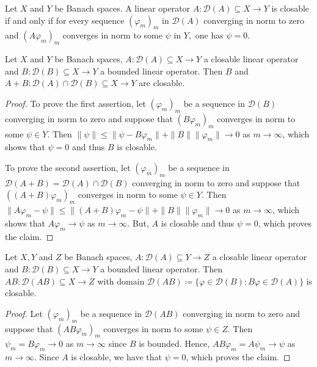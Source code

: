\documentclass[english]{myarticle}
\begin{document}
\begin{sloppypar}
\begin{lemma} \label{lemma:closabledef}
Let $X$ and $Y$ be Banach spaces. A linear operator $A : \mathcal{D}(A) \subseteq X \to Y$ is closable if and only if for every sequence $(\varphi_m)_m$ in $\mathcal{D}(A)$ converging in norm to zero and $(A \varphi_m)_m$ converges in norm to some $\psi$ in $Y,$ one has $\psi = 0$.
\end{lemma}

\begin{lemma} \label{lemma:closablesum}
   Let $X$ and $Y$ be Banach spaces, $A : \mathcal{D}(A) \subseteq X \to Y$ a closable linear operator and $B : \mathcal{D}(B) \subseteq X \to Y$ a bounded linear operator. Then $B$ and $A + B : \mathcal{D}(A) \cap \mathcal{D}(B) \subseteq X \to Y$ are closable.
\end{lemma}
\begin{proof}
To prove the first assertion, let $(\varphi_m)_m$ be a sequence in $\mathcal{D}(B)$ converging in norm to zero and suppose that $(B\varphi_m)_m$ converges in norm to some $\psi \in Y$. Then $\|\psi\| \leq \| \psi - B \varphi_m \| + \|B\| \|\varphi_m\| \to 0$ as $m \to \infty$, which shows that $\psi = 0$ and thus $B$ is closable.

To prove the second assertion, let $(\varphi_m)_m$ be a sequence in $\mathcal{D}(A + B) = \mathcal{D}(A) \cap \mathcal{D}(B)$ converging in norm to zero and suppose that $((A+B)\varphi_m)_m$ converges in norm to some $\psi \in Y$. Then $\|A \varphi_m - \psi \| \leq \|(A+B)\varphi_m - \psi \| + \|B \| \|\varphi_m\| \to 0$ as $m \to \infty$, which shows that $A\varphi_m \to \psi$ as $m \to \infty$. But, $A$ is closable and thus $\psi = 0$, which proves the claim.
\end{proof}

\begin{lemma} \label{lemma:compoclosable}
    Let $X,Y$ and $Z$ be Banach spaces, $A : \mathcal{D}(A) \subseteq Y \to Z$ a closable linear operator and $B : \mathcal{D}(B) \subseteq X \to Y$ a bounded linear operator. Then $AB : \mathcal{D}(AB) \subseteq X \to Z$ with domain $\mathcal{D}(AB) \coloneqq \{\varphi \in \mathcal{D}(B) : B \varphi \in \mathcal{D}(A) \}$ is closable.
\end{lemma}
\begin{proof}
Let $(\varphi_m)_m$ be a sequence in $\mathcal{D}(AB)$ converging in norm to zero and suppose that $(AB\varphi_m)_m$ converges in norm to some $\psi \in Z$. Then $\psi_m = B\varphi_m \to 0$ as $m \to \infty$ since $B$ is bounded. Hence, $AB \varphi_m = A \psi_m \to \psi$ as $m \to \infty$. Since $A$ is closable, we have that $\psi = 0$, which proves the claim.
\end{proof}


\end{sloppypar}
\end{document}
